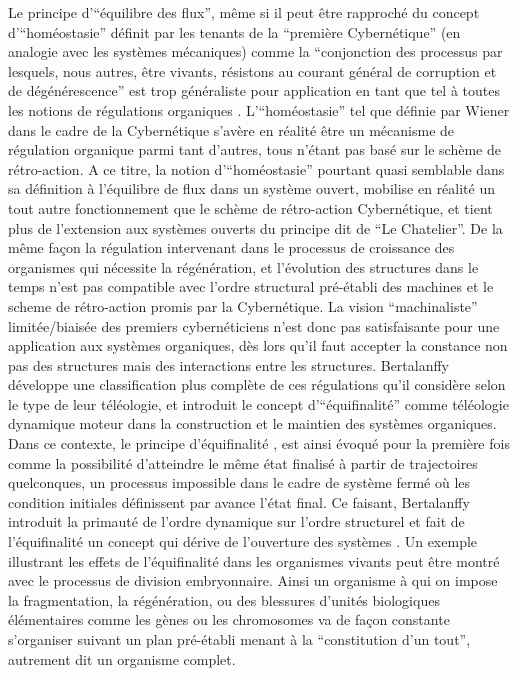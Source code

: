 Le principe d'\enquote{équilibre des flux}, même si il peut être rapproché du concept d'\enquote{homéostasie} définit par les tenants de la \enquote{première Cybernétique} (en analogie avec les systèmes mécaniques) comme la \enquote{conjonction des processus par lesquels, nous autres, être vivants, résistons au courant général de corruption et de dégénérescence} est trop généraliste pour application en tant que tel à toutes les notions de régulations organiques \autocite[194]{Morin1977}. L'\enquote{homéostasie} tel que définie par Wiener dans le cadre de la Cybernétique s'avère en réalité être un mécanisme de régulation organique parmi tant d'autres, tous n'étant pas basé sur le schème de rétro-action. A ce titre, la notion d'\enquote{homéostasie} pourtant quasi semblable dans sa définition à l'équilibre de flux dans un système ouvert, mobilise en réalité un tout autre fonctionnement que le schème de rétro-action Cybernétique, et tient plus de l'extension aux systèmes ouverts du principe dit de \enquote{Le Chatelier}. De la même façon la régulation intervenant dans le processus de croissance des organismes qui nécessite la régénération, et l'évolution des structures dans le temps n'est pas compatible avec l'ordre structural pré-établi des machines et le scheme de rétro-action promis par la Cybernétique. La vision \enquote{machinaliste} limitée/biaisée des premiers cybernéticiens n'est donc pas satisfaisante pour une application aux systèmes organiques, dès lors qu'il faut accepter la constance non pas des structures mais des interactions entre les structures. Bertalanffy développe une classification plus complète de ces régulations qu'il considère selon le type de leur téléologie, et introduit le concept d'\enquote{équifinalité} comme téléologie dynamique moteur dans la construction et le maintien des systèmes organiques. Dans ce contexte, le principe d'équifinalité \autocite[131]{Pouvreau2013}, est ainsi évoqué pour la première fois comme la possibilité d'atteindre le même état finalisé à partir de trajectoires quelconques, un processus impossible dans le cadre de système fermé où les condition initiales définissent par avance l'état final. Ce faisant, Bertalanffy introduit la primauté de l'ordre dynamique sur l'ordre structurel et fait de l'équifinalité un concept qui dérive de l'ouverture des systèmes \autocite[489,647]{Pouvreau2013}. Un exemple illustrant les effets de l'équifinalité dans les organismes vivants peut être montré avec le processus de division embryonnaire. Ainsi un organisme à qui on impose la fragmentation, la régénération, ou des blessures d'unités biologiques élémentaires comme les gènes ou les chromosomes va de façon constante s'organiser suivant un plan pré-établi menant à la \enquote{constitution d'un tout}, autrement dit un organisme complet.

